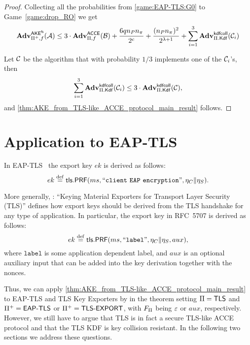 \begin{proof}
Collecting all the probabilities from \cref{game:EAP-TLS:G0} to Game~\ref{game:drop_RO}
we get 
\begin{equation}
	\adv_{\protocolderived,f}^{\akefs}(\A)
		\leq 3 \cdot \adv_{\protocol,f}^{\acce}(\A[B])
		+ \frac{6 \unionbound}{2^{c}}
		+ \frac{(\numparties \numsessions)^2 }{2^{\noncelen+1}}
		+ \sum_{i=1}^{3} \adv_{\protocol.\mathsf{Kdf}}^{\kdfcoll}(\A[C]_i)
\end{equation}

Let $\A[C]$ be the algorithm that with probability $1 / 3$ implements one of the $\A[C]_i$'s,
then
\begin{equation}
	\sum_{i=1}^{3} \adv_{\protocol.\mathsf{Kdf}}^{\kdfcoll}(\A[C]_i) \leq 3 \cdot \adv_{\protocol.\mathsf{Kdf}}^{\kdfcoll}(\A[C]),
\end{equation}
and \cref{thm:AKE_from_TLS-like_ACCE_protocol_main_result} follows.
\end{proof}



\section{Application to EAP-TLS}\label{sec:EAP-TLS-security:application_EAP-TLS}


In EAP-TLS~\cite{IETF:RFC5216:EAP-TLS} the export key $ek$  is derived as follows:
\begin{equation}\label{eq:TLS-key-exporters:key_derivation}
	ek \defeq \mathsf{tls.PRF}(ms, ``\mathtt{client\ EAP\ encryption}", \nonce_{C} \concat \nonce_{S})  .
\end{equation}

More generally,
\cite{IETF:RFC5705:TLS-key-exporters}: ``Keying Material Exporters for Transport Layer Security (TLS)''
defines how export keys should be derived from the TLS handshake for any type of application.
In particular,
the export key in RFC~5707 is derived as follows:
\begin{equation}
	ek \defeq \mathsf{tls.PRF}(ms, ``\mathtt{label}", \nonce_{C} \concat \nonce_{S}, aux) ,
\end{equation}
where $\mathtt{label}$ is some application dependent label,
and $aux$ is an optional auxiliary input that can be added into the key derivation together with the nonces.

Thus,
we can apply \cref{thm:AKE_from_TLS-like_ACCE_protocol_main_result} to EAP-TLS and TLS Key Exporters by in the theorem setting $\protocol = \mathsf{TLS}$ and  $\protocolderived = \operatorname{\mathsf{EAP-TLS}}$ or $\protocolderived = \operatorname{\mathsf{TLS-EXPORT}}$,
with $F_\protocol$ being $\emptystring$ or $aux$,
respectively. 
However,
we still have to argue that TLS is in fact a secure TLS-like ACCE protocol and that the TLS KDF is key collision resistant.
In the following two sections we address these questions.








